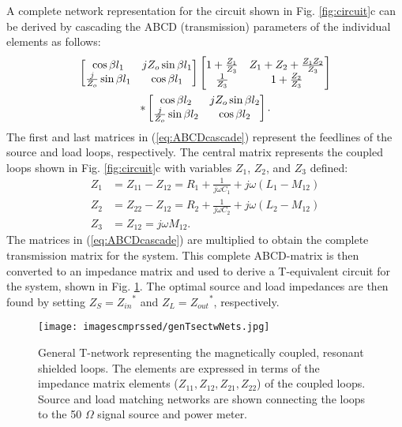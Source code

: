 \documentclass[journal]{IEEEtran}
\begin{document}
A complete network representation for the circuit shown in Fig. \ref{fig:circuit}c can be derived by cascading the ABCD (transmission) parameters of the individual elements as follows:
\begin{gather}
    \begin{bmatrix}
        \cos \beta l_1 & jZ_o \sin \beta l_1 \\
        \frac{j}{Z_o} \sin \beta l_1 & \cos \beta l_1
    \end{bmatrix}
    \begin{bmatrix}
        1+\frac{Z_1}{Z_3} & Z_1+Z_2+\frac{Z_1Z_2}{Z_3} \\
        \frac{1}{Z_3} & 1+\frac{Z_2}{Z_3}
    \end{bmatrix}
    \notag \\
    *
    \begin{bmatrix}
        \cos \beta l_2 & jZ_o \sin \beta l_2 \\
        \frac{j}{Z_o} \sin \beta l_2 & \cos \beta l_2
    \end{bmatrix}.
    \label{eq:ABCDcascade}
\end{gather}
The first and last matrices in (\ref{eq:ABCDcascade}) represent the feedlines of the source and load loops, respectively. The central matrix represents the coupled loops shown in Fig. \ref{fig:circuit}c \cite{Pozar} with variables $Z_1$, $Z_2$, and $Z_3$ defined:
\begin{subequations}
\begin{align}
Z_1 &= Z_{11}-Z_{12} = R_1+\frac{1}{j\omega C_1}+j\omega \left(L_1-M_{12}\right) \label{eq:Z1} \\
Z_2 &= Z_{22}-Z_{12} = R_2+\frac{1}{j\omega C_2}+j\omega \left(L_2-M_{12}\right) \label{eq:Z2}\\
Z_3 &= Z_{12} = j\omega M_{12}. \label{eq:Z3}
\end{align}
\label{eq:Zexpressions}
\end{subequations}
The matrices in (\ref{eq:ABCDcascade}) are multiplied to obtain the complete transmission matrix for the system. This complete ABCD-matrix is then converted to an impedance matrix \cite{Pozar} and used to derive a T-equivalent circuit for the system, shown in Fig. \ref{fig:genTsect}. The optimal source and load impedances are then found by setting $Z_S={Z_{in}}^*$ and $Z_L={Z_{out}}^*$, respectively.
\begin{figure}[htbp]
    \centering
    \texttt{[image: imagescmprssed/genTsectwNets.jpg]}
    \caption{General T-network representing the magnetically coupled, resonant shielded loops. The elements are expressed in terms of the impedance matrix elements ($Z_{11},Z_{12},Z_{21},Z_{22}$) of the coupled loops. Source and load matching networks are shown connecting the loops to the 50 $\Omega$ signal source and power meter.}
    \label{fig:genTsect}
\end{figure}
\end{document}
